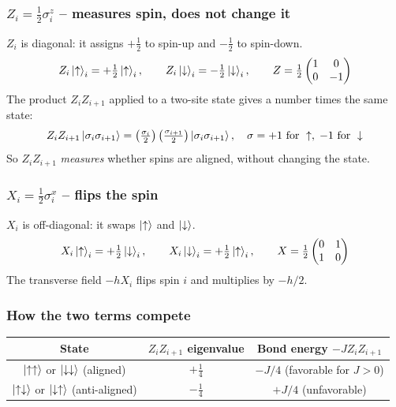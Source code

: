 \documentclass[11pt, a4paper]{article}
\begin{document}
\subsubsection*{$Z_i = \tfrac{1}{2}\sigma^z_i$ -- measures spin, does not change it}

$Z_i$ is diagonal: it assigns $+\tfrac{1}{2}$ to spin-up and $-\tfrac{1}{2}$ to spin-down.
\begin{equation}
  Z_i \ket{\uparrow}_i = +\tfrac{1}{2}\ket{\uparrow}_i, \qquad
  Z_i \ket{\downarrow}_i = -\tfrac{1}{2}\ket{\downarrow}_i, \qquad
  Z = \tfrac{1}{2}\begin{pmatrix}1&0\\0&-1\end{pmatrix}
\end{equation}
The product $Z_i Z_{i+1}$ applied to a two-site state gives a number times the same state:
\begin{equation}
  Z_i Z_{i+1} \ket{\sigma_i \sigma_{i+1}} = \left(\tfrac{\sigma_i}{2}\right)\left(\tfrac{\sigma_{i+1}}{2}\right)\ket{\sigma_i \sigma_{i+1}},
  \quad \sigma = +1\text{ for }\uparrow,\; -1\text{ for }\downarrow
\end{equation}
So $Z_i Z_{i+1}$ \emph{measures} whether spins are aligned, without changing the state.

\subsubsection*{$X_i = \tfrac{1}{2}\sigma^x_i$ -- flips the spin}

$X_i$ is off-diagonal: it swaps $\ket{\uparrow}$ and $\ket{\downarrow}$.
\begin{equation}
  X_i \ket{\uparrow}_i = +\tfrac{1}{2}\ket{\downarrow}_i, \qquad
  X_i \ket{\downarrow}_i = +\tfrac{1}{2}\ket{\uparrow}_i, \qquad
  X = \tfrac{1}{2}\begin{pmatrix}0&1\\1&0\end{pmatrix}
\end{equation}
The transverse field $-h X_i$ flips spin $i$ and multiplies by $-h/2$.

\subsubsection*{How the two terms compete}

\begin{center}
\renewcommand{\arraystretch}{1.3}
\begin{tabular}{ccc}
\toprule
State & $Z_i Z_{i+1}$ eigenvalue & Bond energy $-JZ_iZ_{i+1}$ \\
\midrule
$\ket{\uparrow\uparrow}$ or $\ket{\downarrow\downarrow}$ (aligned)   & $+\tfrac{1}{4}$ & $-J/4$ \quad (favorable for $J>0$) \\
$\ket{\uparrow\downarrow}$ or $\ket{\downarrow\uparrow}$ (anti-aligned) & $-\tfrac{1}{4}$ & $+J/4$ \quad (unfavorable) \\
\bottomrule
\end{tabular}
\end{center}
\end{document}

